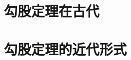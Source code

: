 \documentclass[UTF8]{ctexart}
\author{张三}
\date{\today}
\begin{document}
  \maketitle %
  \tableofcontents %
  \section{勾股定理在古代}
    
  \section{勾股定理的近代形式}
\end{document}

